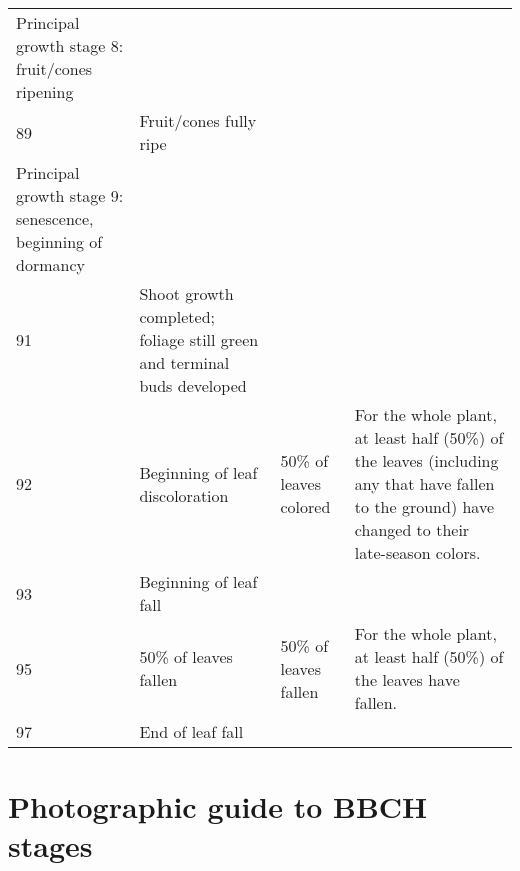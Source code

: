 \documentclass{article}
\begin{document}
\begin{landscape}
\begin{longtable}{p{}p{}|p{}p{}}
  Principal growth stage 8: fruit/cones ripening &  &  &  \\ 
  89 & Fruit/cones fully ripe &  &  \\ 
  Principal growth stage 9: senescence, beginning of dormancy &  &  &  \\ 
  91 & Shoot growth completed; foliage still green and terminal buds developed &  &  \\ 
  92 & Beginning of leaf discoloration & 50\% of leaves colored & For the whole plant, at least half (50\%) of the leaves (including any that have fallen to the ground) have changed to their late-season colors. \\ 
  93 & Beginning of leaf fall &  &  \\ 
  95 & 50\% of leaves fallen & 50\% of leaves fallen & For the whole plant, at least half (50\%) of the leaves have fallen. \\ 
  97 & End of leaf fall &  &  \\ 
   \hline
\hline
\end{longtable}
\endgroup\end{landscape}
\newpage

\section*{Photographic guide to BBCH stages}

\end{document}
